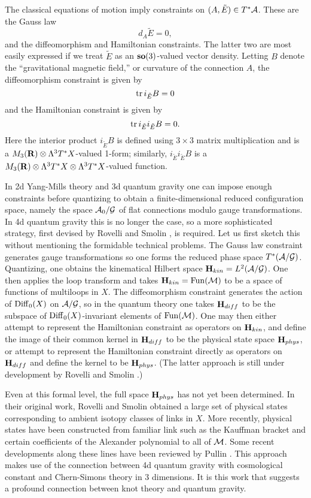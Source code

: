 \documentclass[12pt]{article}
\newcommand{\tensor}{\otimes}
\newcommand{\A}{{\cal A}}
\newcommand{\G}{{\cal G}}
\newcommand{\M}{{\cal M}}
\renewcommand{\H}{{\bf H}}
\newcommand{\so}{{\bf so}}      %
\newcommand{\R}{{\bf R}}
\newcommand{\tr}{{\rm tr}}
\newcommand{\Diff}{{\rm Diff}}
\newcommand{\Fun}{{\rm Fun}}
\begin{document}
The classical equations of motion imply constraints on $(A,\tilde E) \in
T^\ast \A$.  These are the Gauss law
\[          d_A \tilde E = 0, \]
and the diffeomorphism and Hamiltonian constraints.  The latter two are
most easily expressed if we treat $\tilde E$ as an $\so(3)$-valued
vector density.    Letting $B$ denote the ``gravitational magnetic field,'' or
curvature of the connection $A$, the diffeomorphism constraint is given
by
\[      \tr \,i_{\tilde E} B = 0 \]
and the Hamiltonian constraint is given by
\[      \tr\, i_{\tilde E} i_{\tilde E} B = 0 .\]
Here the interior product $i_{\tilde E} B$ is defined using $3\times 3$ matrix
multiplication and is a $M_3(\R) \tensor \Lambda^3 T^\ast X$-valued 1-form;
similarly, $i_{\tilde E} i_{\tilde E} B$ is a $M_3(\R) \tensor \Lambda^3
T^\ast X \tensor \Lambda^3 T^\ast X$-valued function.


In 2d Yang-Mills theory and 3d quantum gravity one can impose enough
constraints before quantizing to obtain a finite-dimensional reduced
configuration space, namely the space $\A_0/\G$ of flat connections modulo
gauge transformations.  In 4d quantum gravity this is no longer the case,
so a more sophisticated strategy, first devised by Rovelli
and Smolin \cite{RS}, is required.  Let us first sketch this without
mentioning the
formidable technical problems.   The Gauss law constraint generates gauge
transformations so one forms the reduced phase space $T^\ast(\A/\G)$.
Quantizing, one obtains the kinematical Hilbert space $\H_{kin} =
L^2(\A/\G)$.  One then applies the loop transform and takes
$\H_{kin} = \Fun(\M)$ to be a space of functions of multiloops in $X$.  The
diffeomorphism constraint generates the action of $\Diff_0(X)$ on $\A/\G$,
so in the quantum theory one takes $\H_{diff}$ to be the subspace of
$\Diff_0(X)$-invariant elements of $\Fun(\M)$.  One may then either attempt
to represent the Hamiltonian constraint as operators on $\H_{kin}$, and
define the image of their common kernel in $\H_{diff}$ to be the physical
state space $\H_{phys}$, or attempt to represent the Hamiltonian constraint
directly as operators on $\H_{diff}$ and define the kernel to be
$\H_{phys}$.  (The latter approach is still under development by Rovelli
and Smolin \cite{RS2}.)

Even at this formal level, the full space $\H_{phys}$ has not yet been
determined.  In their original work, Rovelli and Smolin \cite{RS} obtained
a large set of physical states corresponding to ambient isotopy classes of
links in $X$.  More recently, physical states have been constructed from
familiar link such as the Kauffman bracket and certain coefficients of the
Alexander polynomial to all of $\M$.   Some recent developments along these
lines have been reviewed by Pullin \cite{Pullin}.  This approach makes use
of the connection between 4d quantum gravity with cosmological constant and
Chern-Simons theory in 3 dimensions.   It is this work that suggests a
profound connection between knot theory and quantum gravity.
\end{document}
